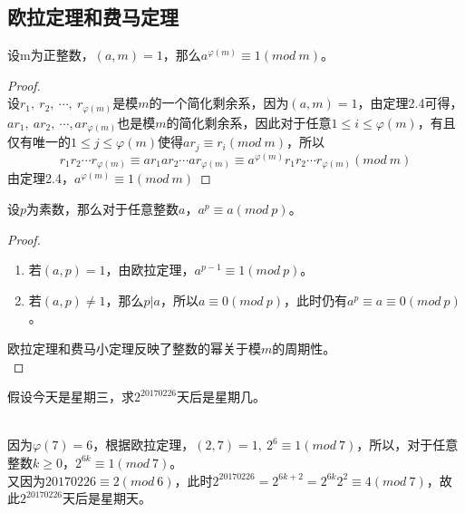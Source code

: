 \documentclass[cn,10pt]{elegantbook}
\begin{document}
\subsection{欧拉定理和费马定理}
\begin{theorem}[欧拉定理]
  设m为正整数，$(a,m)=1$，那么$a^{\varphi(m)} \equiv 1(mod \ m)$。
\end{theorem}
\begin{proof}
  \\ 设$r_1,\ r_2,\ \cdots ,\ r_{\varphi(m)}$是模$m$的一个简化剩余系，因为$(a,m) = 1 $，由定理2.4可得，$ar_1,\ ar_2,\ \cdots,ar_{\varphi(m)}$也是模$m$的简化剩余系，因此对于任意$1 \leq i \leq \varphi(m)$，有且仅有唯一的$1 \leq j \leq \varphi(m)$使得$ar_j \equiv r_i(mod \ m)$，所以
  \begin{equation*}
    r_1r_2 \cdots r_{\varphi(m)} \equiv ar_1ar_2 \cdots ar_{\varphi(m)} \equiv a^{\varphi(m)}r_1r_2 \cdots r_{\varphi(m)}(mod \ m)
  \end{equation*}
  由定理2.4，$a^{\varphi(m)} \equiv 1 (mod \ m)$
\end{proof}
\begin{theorem}[费马小定理]
  设$p$为素数，那么对于任意整数$a$，$a^p \equiv a(mod \ p)$。
\end{theorem}
\begin{proof}
  \begin{enumerate}[(1)]
    \item 若$(a,p) =1 $，由欧拉定理，$a^{p-1} \equiv 1 (mod \ p)$。
    \item 若$(a,p) \neq 1$，那么$p | a$，所以$a \equiv 0(mod \ p)$，此时仍有$a^p \equiv a \equiv 0(mod \ p)$。
  \end{enumerate}
  欧拉定理和费马小定理反映了整数的幂关于模$m$的周期性。 \\
\end{proof}
\begin{exercise}
  假设今天是星期三，求$2^{20170226}$天后是星期几。
\end{exercise}
\begin{solution}
  \\ 因为$\varphi(7) = 6$，根据欧拉定理，$(2,7) =1,\ 2^6 \equiv 1 (mod \ 7)$，所以，对于任意整数$k \geq 0$，$2^{6k} \equiv 1 (mod \ 7)$。\\
  又因为$20170226 \equiv 2 (mod \ 6)$，此时$2^{20170226} = 2^{6k+2} = 2^{6k}2^2 \equiv 4(mod \ 7)$，故此$2^{20170226}$天后是星期天。
\end{solution}
\end{document}
